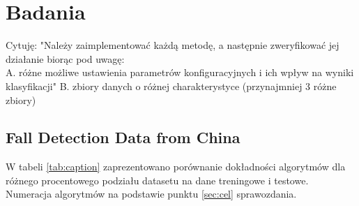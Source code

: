 \documentclass[a4paper,11pt]{article}
\begin{document}
\section{Badania}
\color{red}
Cytuję: "Należy zaimplementować każdą metodę, a następnie zweryfikować jej działanie biorąc pod uwagę:\\
A. różne możliwe ustawienia parametrów konfiguracyjnych i ich wpływ na wyniki klasyfikacji"
B. zbiory danych o różnej charakterystyce (przynajmniej 3 różne zbiory)
\color{black}

\subsection{Fall Detection Data from China}
W tabeli \ref{tab:caption} zaprezentowano porównanie dokładności algorytmów dla różnego procentowego podziału datasetu na dane treningowe i testowe. Numeracja algorytmów na podstawie punktu \ref{sec:cel} sprawozdania.
\end{document}
